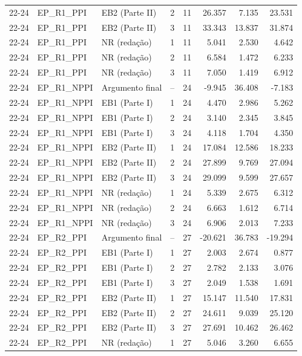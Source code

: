 \begin{longtable}{lllcrrrr}
22-24 & EP\_R1\_PPI & EB2 (Parte II) & 2 & 11 & 26.357 & 7.135 & 23.531 \\
22-24 & EP\_R1\_PPI & EB2 (Parte II) & 3 & 11 & 33.343 & 13.837 & 31.874 \\
22-24 & EP\_R1\_PPI & NR (redação) & 1 & 11 & 5.041 & 2.530 & 4.642 \\
22-24 & EP\_R1\_PPI & NR (redação) & 2 & 11 & 6.584 & 1.472 & 6.233 \\
22-24 & EP\_R1\_PPI & NR (redação) & 3 & 11 & 7.050 & 1.419 & 6.912 \\
22-24 & EP\_R1\_NPPI & Argumento final & -- & 24 & -9.945 & 36.408 & -7.183 \\
22-24 & EP\_R1\_NPPI & EB1 (Parte I) & 1 & 24 & 4.470 & 2.986 & 5.262 \\
22-24 & EP\_R1\_NPPI & EB1 (Parte I) & 2 & 24 & 3.140 & 2.345 & 3.845 \\
22-24 & EP\_R1\_NPPI & EB1 (Parte I) & 3 & 24 & 4.118 & 1.704 & 4.350 \\
22-24 & EP\_R1\_NPPI & EB2 (Parte II) & 1 & 24 & 17.084 & 12.586 & 18.233 \\
22-24 & EP\_R1\_NPPI & EB2 (Parte II) & 2 & 24 & 27.899 & 9.769 & 27.094 \\
22-24 & EP\_R1\_NPPI & EB2 (Parte II) & 3 & 24 & 29.099 & 9.599 & 27.657 \\
22-24 & EP\_R1\_NPPI & NR (redação) & 1 & 24 & 5.339 & 2.675 & 6.312 \\
22-24 & EP\_R1\_NPPI & NR (redação) & 2 & 24 & 6.663 & 1.612 & 6.714 \\
22-24 & EP\_R1\_NPPI & NR (redação) & 3 & 24 & 6.906 & 2.013 & 7.233 \\
22-24 & EP\_R2\_PPI & Argumento final & -- & 27 & -20.621 & 36.783 & -19.294 \\
22-24 & EP\_R2\_PPI & EB1 (Parte I) & 1 & 27 & 2.003 & 2.674 & 0.877 \\
22-24 & EP\_R2\_PPI & EB1 (Parte I) & 2 & 27 & 2.782 & 2.133 & 3.076 \\
22-24 & EP\_R2\_PPI & EB1 (Parte I) & 3 & 27 & 2.049 & 1.538 & 1.691 \\
22-24 & EP\_R2\_PPI & EB2 (Parte II) & 1 & 27 & 15.147 & 11.540 & 17.831 \\
22-24 & EP\_R2\_PPI & EB2 (Parte II) & 2 & 27 & 24.611 & 9.039 & 25.120 \\
22-24 & EP\_R2\_PPI & EB2 (Parte II) & 3 & 27 & 27.691 & 10.462 & 26.462 \\
22-24 & EP\_R2\_PPI & NR (redação) & 1 & 27 & 5.046 & 3.260 & 6.655 \\

\end{longtable}
